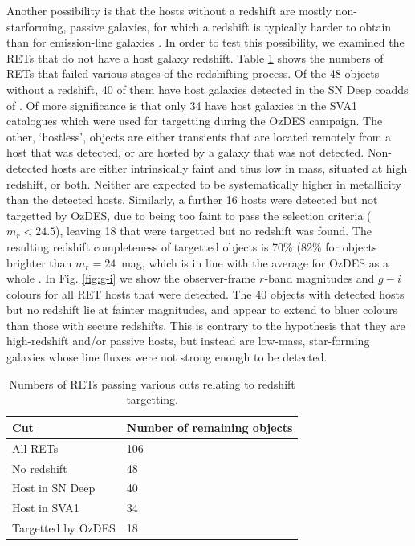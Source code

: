 \documentclass[fleqn,usenatbib,]{mnras}
\begin{document}
Another possibility is that the hosts without a redshift are mostly non-starforming, passive galaxies, for which a redshift is typically harder to obtain than for emission-line galaxies \citep{Yuan2015,Childress2017,Lidman2020}. In order to test this possibility, we examined the RETs that do not have a host galaxy redshift. Table \ref{tab:z_cuts} shows the numbers of RETs that failed various stages of the redshifting process. Of the 48 objects without a redshift, 40 of them have host galaxies detected in the SN Deep coadds of \citet{Wiseman2020}. Of more significance is that only 34 have host galaxies in the SVA1 catalogues which were used for targetting during the OzDES campaign. The other, `hostless', objects are either transients that are located remotely from a host that was detected, or are hosted by a galaxy that was not detected. Non-detected hosts are either intrinsically faint and thus low in mass, situated at high redshift, or both. Neither are expected to be systematically higher in metallicity than the detected hosts. Similarly, a further 16 hosts were detected but not targetted by OzDES, due to being too faint to pass the selection criteria ($m_r < 24.5$), leaving 18 that were targetted but no redshift was found. The resulting redshift completeness of targetted objects is 70\% (82\% for objects brighter than $m_r = 24$~mag, which is in line with the average for OzDES as a whole \citep{Lidman2020}.
In Fig. \ref{fig:g-i} we show the observer-frame $r$-band magnitudes and $g-i$ colours for all RET hosts that were detected. The 40 objects with detected hosts but no redshift lie at fainter magnitudes, and appear to extend to bluer colours than those with secure redshifts. This is contrary to the hypothesis that they are high-redshift and/or passive hosts, but instead are low-mass, star-forming galaxies whose line fluxes were not strong enough to be detected.
 

\begin{table}
    \centering
    \begin{tabular}{l|l}
         Cut &  Number of remaining objects \\
        \toprule
        All RETs & 106 \\
        No redshift   & 48\\
        Host in SN Deep & 40\\
        Host in SVA1 & 34 \\
        Targetted by OzDES & 18 \\
        \bottomrule
    \end{tabular}
    \caption{Numbers of RETs passing various cuts relating to redshift targetting.}
    \label{tab:z_cuts}
\end{table}
\end{document}
